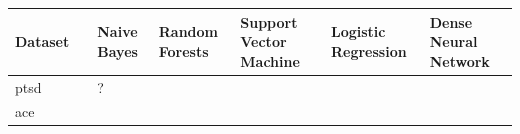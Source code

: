\documentclass[
]{article}
\begin{document}
\begin{longtable}[]{@{}lllllll@{}}
\toprule
\begin{minipage}[b]{0.29\columnwidth}\raggedright
Dataset\strut
\end{minipage} & \begin{minipage}[b]{0.03\columnwidth}\raggedright
\strut
\end{minipage} & \begin{minipage}[b]{0.10\columnwidth}\raggedright
Naive Bayes\strut
\end{minipage} & \begin{minipage}[b]{0.10\columnwidth}\raggedright
Random Forests\strut
\end{minipage} & \begin{minipage}[b]{0.10\columnwidth}\raggedright
Support Vector Machine\strut
\end{minipage} & \begin{minipage}[b]{0.10\columnwidth}\raggedright
Logistic Regression\strut
\end{minipage} & \begin{minipage}[b]{0.10\columnwidth}\raggedright
Dense Neural Network\strut
\end{minipage}\tabularnewline
\midrule
\endhead
\begin{minipage}[t]{0.29\columnwidth}\raggedright
ptsd\strut
\end{minipage} & \begin{minipage}[t]{0.03\columnwidth}\raggedright
\strut
\end{minipage} & \begin{minipage}[t]{0.10\columnwidth}\raggedright
?\strut
\end{minipage} & \begin{minipage}[t]{0.10\columnwidth}\raggedright
\strut
\end{minipage} & \begin{minipage}[t]{0.10\columnwidth}\raggedright
\strut
\end{minipage} & \begin{minipage}[t]{0.10\columnwidth}\raggedright
\strut
\end{minipage} & \begin{minipage}[t]{0.10\columnwidth}\raggedright
\strut
\end{minipage}\tabularnewline
\begin{minipage}[t]{0.29\columnwidth}\raggedright
ace\strut
\end{minipage} & \begin{minipage}[t]{0.03\columnwidth}\raggedright

\end{minipage}
\end{longtable}
\end{document}
